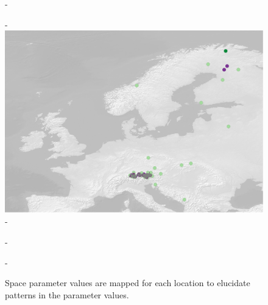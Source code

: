 \documentclass{article}\usepackage[]{graphicx}\usepackage[]{color}
\begin{document}
{\begin{figure} [H]
  -\begin{center}
  -\includegraphics[width=12cm]{..//figures/space_extremes.pdf}
  -\caption{Space parameter values are mapped for each location to elucidate patterns in the parameter values.}\label{fig:space}
  -\end{center}
  -\end{figure}}
  
\end{document}
